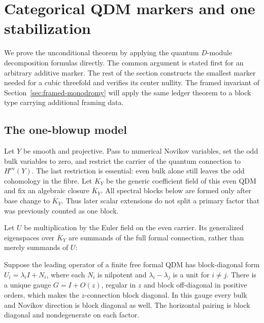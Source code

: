 \section{Categorical QDM markers and one stabilization}
\label{sec:atomic-one-step}

We prove the unconditional theorem by applying the quantum \(D\)-module
decomposition formulas directly.  The common argument is stated first for an
arbitrary additive marker.  The rest of the section constructs the smallest
marker needed for a cubic threefold and verifies its center nullity.  The
framed invariant of Section~\ref{sec:framed-monodromy} will apply the same
ledger theorem to a block type carrying additional framing data.

\subsection{The one-blowup model}

Let \(Y\) be smooth and projective.  Pass to numerical Novikov variables,
set the odd bulk variables to zero, and restrict the carrier of the quantum
connection to \(H^{\mathrm{ev}}(Y)\).  The last restriction is essential: even
bulk alone still leaves the odd cohomology in the fibre.  Let \(K_Y\) be the
generic coefficient field of this even QDM and fix an algebraic closure
\(\overline K_Y\).  All spectral blocks below are formed only after base change
to \(\overline K_Y\).  Thus later scalar extensions do not split a primary
factor that was previously counted as one block.

Let \(U\) be multiplication by the Euler field on the even carrier.  Its
generalized eigenspaces over \(\overline K_Y\) are summands of the full formal
connection, rather than merely summands of \(U\):

\begin{proposition}
\label{prop:generic-spectral-connection-splitting}
%
%
Suppose the leading operator of a finite free formal QDM has block-diagonal
form \(U_i=\lambda_iI+N_i\), where each \(N_i\) is nilpotent and
\(\lambda_i-\lambda_j\) is a unit for \(i\ne j\).  There is a unique gauge
\(G=I+O(z)\), regular in \(z\) and block off-diagonal in positive orders,
which makes the \(z\)-connection block diagonal.  In this gauge every bulk
and Novikov direction is block diagonal as well.  The horizontal pairing is
block diagonal and nondegenerate on each factor.
\end{proposition}

